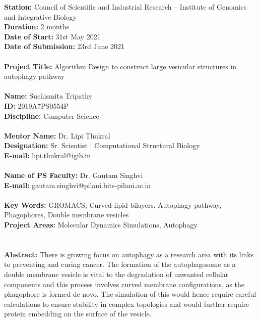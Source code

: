 \documentclass[12pt, a4paper]{report}
\begin{document}
\textbf{Station:} Council of Scientific and Industrial Research – Institute of Genomics and Integrative Biology 
\\\textbf{Duration:} 2 months                         \\\textbf{Date of Start:} 31st May 2021 
\\\textbf{Date of Submission:} 23rd June 2021 
\\~\\\textbf{Project Title:} Algorithm Design to construct large vesicular structures in autophagy pathway 
\\~\\
\textbf{Name:} Suchismita Tripathy 
\\\textbf{ID:} 2019A7PS0554P 
\\\textbf{Discipline:} Computer Science 
\\~\\
\textbf{Mentor Name:} Dr. Lipi Thukral 
\\\textbf{Designation:} Sr. Scientist | Computational Structural Biology
\\\textbf{E-mail:} lipi.thukral@igib.in 
\\~\\
\textbf{Name of PS Faculty:} Dr. Gautam Singhvi 
\\\textbf{E-mail:} gautam.singhvi@pilani.bits-pilani.ac.in 
\\~\\
\textbf{Key Words: }GROMACS, Curved lipid bilayers, Autophagy pathway, Phagophores, Double membrane vesicles 
\\\textbf{Project Areas:} Molecular Dynamics Simulations, Autophagy
\\~\\~\\
\textbf{Abstract:} There is growing focus on autophagy as a research area with its links to preventing and curing cancer. The formation of the autophagosome as a double membrane vesicle is vital to the degradation of unwanted cellular components and this process involves curved membrane configurations, as the phagophore is formed de novo. The simulation of this would hence require careful calculations to ensure stability in complex topologies and would further require protein embedding on the surface of the vesicle. 

\clearpage 

\newpage 
\tableofcontents
\end{document}
